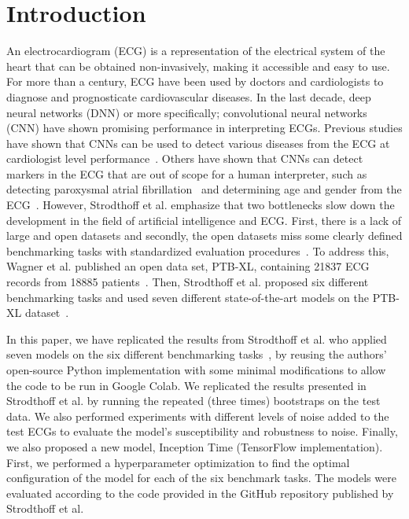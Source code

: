 \section{Introduction}
An electrocardiogram (ECG) is a representation of the electrical system of the heart that can be obtained non-invasively, making it accessible and easy to use. For more than a century, ECG have been used by doctors and cardiologists to diagnose and prognosticate cardiovascular diseases. In the last decade, deep neural networks (DNN) or more specifically; convolutional neural networks (CNN)  have shown promising performance in interpreting ECGs. Previous studies have shown that CNNs can be used to detect various diseases from the ECG at cardiologist level performance~\cite{hannun_cardiologist-level_2019}. Others have shown that CNNs can detect markers in the ECG that are out of scope for a human interpreter, such as detecting paroxysmal atrial fibrillation~\cite{attia_et_al_artificial_2019} and determining age and gender from the ECG~\cite{attia_et_al_age_2019}. 
However, Strodthoff et al. emphasize that two bottlenecks slow down the development in the field of artificial intelligence and ECG. First, there is a lack of large and open datasets and secondly, the open datasets miss some clearly defined benchmarking tasks with standardized evaluation procedures~\cite{strodthoff_deep_2021}. To address this, Wagner et al. published an open data set, PTB-XL, containing 21837 ECG records from 18885 patients~\cite{wagner_et_al_ptb-xl_2020}. Then, Strodthoff et al. proposed six different benchmarking tasks and used seven different state-of-the-art models on the PTB-XL dataset~\cite{strodthoff_deep_2021}.

In this paper, we have replicated the results from Strodthoff et al. who applied seven models on the six different benchmarking tasks~\cite{strodthoff_deep_2021}, by reusing the authors' open-source Python implementation with some minimal modifications to allow the code to be run in Google Colab. We replicated the results presented in Strodthoff et al. by running the repeated (three times) bootstraps on the test data. We also performed experiments with different levels of noise added to the test ECGs to evaluate the model's susceptibility and robustness to noise. Finally, we also proposed a new model, Inception Time (TensorFlow implementation). First, we performed a hyperparameter optimization to find the optimal configuration of the model for each of the six benchmark tasks. The models were evaluated according to the code provided in the GitHub repository published by Strodthoff et al.



